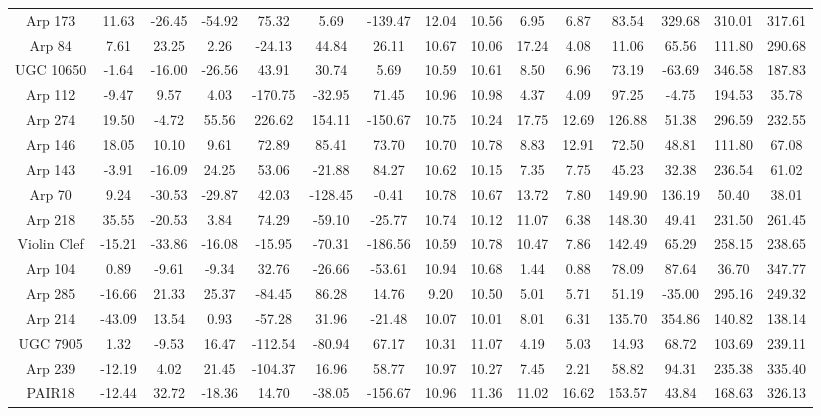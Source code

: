 \begin{table}
{\begin{tabular}{|c|c|c|c|c|c|c|c|c|c|c|c|c|c|c|}
Arp 173 & 11.63 & -26.45 & -54.92 & 75.32 & 5.69 & -139.47 & 12.04 & 10.56 & 6.95 & 6.87 & 83.54 & 329.68 & 310.01 & 317.61 \\
Arp 84 & 7.61 & 23.25 & 2.26 & -24.13 & 44.84 & 26.11 & 10.67 & 10.06 & 17.24 & 4.08 & 11.06 & 65.56 & 111.80 & 290.68 \\
UGC 10650 & -1.64 & -16.00 & -26.56 & 43.91 & 30.74 & 5.69 & 10.59 & 10.61 & 8.50 & 6.96 & 73.19 & -63.69 & 346.58 & 187.83 \\
Arp 112 & -9.47 & 9.57 & 4.03 & -170.75 & -32.95 & 71.45 & 10.96 & 10.98 & 4.37 & 4.09 & 97.25 & -4.75 & 194.53 & 35.78 \\
Arp 274 & 19.50 & -4.72 & 55.56 & 226.62 & 154.11 & -150.67 & 10.75 & 10.24 & 17.75 & 12.69 & 126.88 & 51.38 & 296.59 & 232.55 \\
Arp 146 & 18.05 & 10.10 & 9.61 & 72.89 & 85.41 & 73.70 & 10.70 & 10.78 & 8.83 & 12.91 & 72.50 & 48.81 & 111.80 & 67.08 \\
Arp 143 & -3.91 & -16.09 & 24.25 & 53.06 & -21.88 & 84.27 & 10.62 & 10.15 & 7.35 & 7.75 & 45.23 & 32.38 & 236.54 & 61.02 \\
Arp 70 & 9.24 & -30.53 & -29.87 & 42.03 & -128.45 & -0.41 & 10.78 & 10.67 & 13.72 & 7.80 & 149.90 & 136.19 & 50.40 & 38.01 \\
Arp 218 & 35.55 & -20.53 & 3.84 & 74.29 & -59.10 & -25.77 & 10.74 & 10.12 & 11.07 & 6.38 & 148.30 & 49.41 & 231.50 & 261.45 \\
Violin Clef & -15.21 & -33.86 & -16.08 & -15.95 & -70.31 & -186.56 & 10.59 & 10.78 & 10.47 & 7.86 & 142.49 & 65.29 & 258.15 & 238.65 \\
Arp 104 & 0.89 & -9.61 & -9.34 & 32.76 & -26.66 & -53.61 & 10.94 & 10.68 & 1.44 & 0.88 & 78.09 & 87.64 & 36.70 & 347.77 \\
Arp 285 & -16.66 & 21.33 & 25.37 & -84.45 & 86.28 & 14.76 & 9.20 & 10.50 & 5.01 & 5.71 & 51.19 & -35.00 & 295.16 & 249.32 \\
Arp 214 & -43.09 & 13.54 & 0.93 & -57.28 & 31.96 & -21.48 & 10.07 & 10.01 & 8.01 & 6.31 & 135.70 & 354.86 & 140.82 & 138.14 \\
UGC 7905 & 1.32 & -9.53 & 16.47 & -112.54 & -80.94 & 67.17 & 10.31 & 11.07 & 4.19 & 5.03 & 14.93 & 68.72 & 103.69 & 239.11 \\
Arp 239 & -12.19 & 4.02 & 21.45 & -104.37 & 16.96 & 58.77 & 10.97 & 10.27 & 7.45 & 2.21 & 58.82 & 94.31 & 235.38 & 335.40 \\
PAIR18 & -12.44 & 32.72 & -18.36 & 14.70 & -38.05 & -156.67 & 10.96 & 11.36 & 11.02 & 16.62 & 153.57 & 43.84 & 168.63 & 326.13 \\

\end{tabular}}
\end{table}
